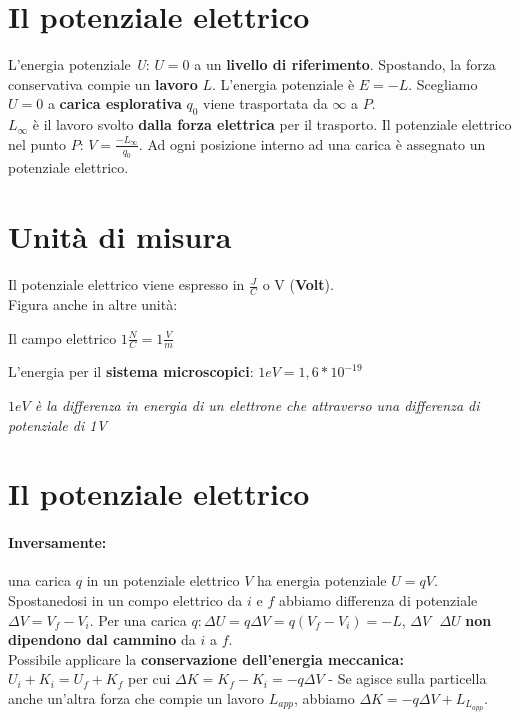 \documentclass{book}
\begin{document}
\section{Il potenziale elettrico}
L'energia potenziale \textit{U}: $U=0$ a un \textbf{livello di riferimento}. Spostando, la forza conservativa compie un \textbf{lavoro} $L$. L'energia potenziale è $E=-L$. Scegliamo $U=0$ a \textbf{carica esplorativa} $q_0$ viene trasportata da $\infty$ a $P$.\\
$L_\infty$ è il lavoro svolto \textbf{dalla forza elettrica} per il trasporto. Il potenziale elettrico nel punto $P$: $V=\frac{-L_\infty}{q_0}$. Ad ogni posizione interno ad una carica è assegnato un potenziale elettrico.
\section{Unità di misura}
Il potenziale elettrico viene espresso in $\frac{J}{C}$ o V (\textbf{Volt}).\\
Figura anche in altre unità:
\begin{center}
  Il campo elettrico $1\frac{N}{C}=1\frac{V}{m}$
\end{center}
L'energia per il \textbf{sistema microscopici}: $1eV=1,6*10^{-19}$
\begin{center}
  \textit{\color{blue} $1eV$ è la differenza in energia di un elettrone che attraverso una differenza di potenziale di 1V}
\end{center}
\section{Il potenziale elettrico}
\paragraph{Inversamente:} una carica $q$ in un potenziale elettrico $V$ ha energia potenziale $U=qV$. Spostanedosi in un compo elettrico da $i$ e $f$ abbiamo differenza di potenziale $\Delta V=V_f-V_i$. Per una carica $q: \Delta U=q\Delta V=q(V_f-V_i)=-L$, $\Delta V \text{ } \Delta U$ \textbf{non dipendono dal cammino} da $i$ a $f$.\\
Possibile applicare la \textbf{conservazione dell'energia meccanica: } $U_i+K_i=U_f+K_f$ per cui $\Delta K=K_f-K_i=-q\Delta V$ - Se agisce sulla particella anche un'altra forza che compie un lavoro $L_{app}$, abbiamo $\Delta K=-q\Delta V+L_{L_{app}}$.
\end{document}

